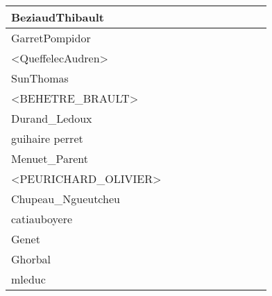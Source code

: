 \documentclass[a4paper]{article}
\begin{document}
\begin{table}[h!]
\begin{tabular}{|l|c|c|c|c|c|c|c|c|c|}
    BeziaudThibault         &       &       &       &       &       &       &       &       &       \\ \hline
    GarretPompidor          &       &       &       &       &       &       &       &       &       \\ \hline
    <QueffelecAudren>       &       &       &       &       &       &       &       &       &       \\ \hline
    SunThomas               &       &       &       &       &       &       &       &       &       \\ \hline
    <BEHETRE\_BRAULT>       &       &       &       &       &       &       &       &       &       \\ \hline
    Durand\_Ledoux          &       &       &       &       &       &       &       &       &       \\ \hline
    guihaire perret         &       &       &       &       &       &       &       &       &       \\ \hline
    Menuet\_Parent          &       &       &       &       &       &       &       &       &       \\ \hline
    <PEURICHARD\_OLIVIER>   &       &       &       &       &       &       &       &       &       \\ \hline
    Chupeau\_Ngueutcheu     &       &       &       &       &       &       &       &       &       \\ \hline
    catiauboyere            &       &       &       &       &       &       &       &       &       \\ \hline
    Genet                   &       &       &       &       &       &       &       &       &       \\ \hline
    Ghorbal                 &       &       &       &       &       &       &       &       &       \\ \hline
    mleduc                  &       &       &       &       &       &       &       &       &       \\ \hline
\end{tabular}
\end{table}
\end{document}
